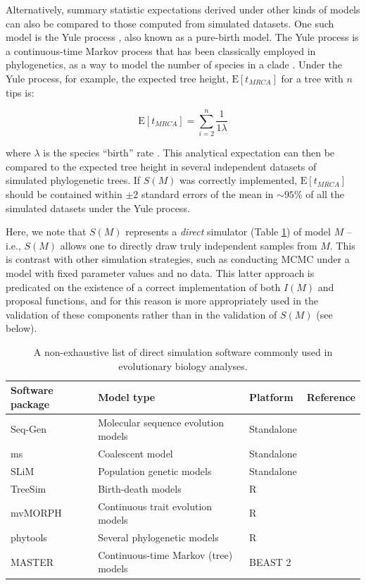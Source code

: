 \documentclass[oneside]{article}
\begin{document}
Alternatively, summary statistic expectations derived under other kinds of models can also be compared
to those computed from simulated datasets.
One such model is the Yule process \citep{yule24}, also known as a pure-birth model.
The Yule process is a continuous-time Markov process that has been
classically employed in phylogenetics, as a way to model the number of
species in a clade \citep{yule24,aldous01}.
Under the Yule process, for example, the expected tree height,
$\text{E}[t_{MRCA}]$ for a tree with $n$ tips is:

\begin{equation}
  \text{E}[t_{MRCA}] = \sum_{i=2}^{n}\frac{1}{1\lambda}
  \label{eq:yule}
\end{equation}

\noindent where $\lambda$ is the species ``birth'' rate \citep{yule24}.
This analytical expectation can then be compared to the expected tree
height in several independent datasets of simulated phylogenetic trees.
If $S(M)$ was correctly implemented, $\text{E}[t_{MRCA}]$ should be contained within $\pm 2$ standard errors of
the mean in $\sim 95\%$ of all the simulated datasets under the Yule process.

Here, we note that $S(M)$ represents a \emph{direct} simulator (Table
\ref{tab:sim}) of model
$M$ -- i.e., $S(M)$ allows one to directly draw truly independent
samples from $M$.
This is contrast with other simulation strategies, such as conducting
MCMC under a model with fixed parameter values and no data.
This latter approach is predicated on the existence of a correct
implementation of both $I(M)$ and proposal functions, and for this
reason is more appropriately used in the validation of these components rather than in
the validation of $S(M)$ (see below).

\begin{center}
  \begin{table}
  \caption{A non-exhaustive list of direct simulation software commonly used in evolutionary
    biology analyses.}
  \label{tab:sim}
  \centering
  \begin{tabular}{ p{0.7in} | p{1.3in} | p{1in} | p{1.1in} }
    \hline
    Software package & Model type & Platform & Reference \\
    \hline  
    Seq-Gen & Molecular sequence evolution models & Standalone & \citealp{rambaut97} \\
    ms & Coalescent model & Standalone & \citealp{hudson02}\\
    SLiM & Population genetic models & Standalone & \citealp{haller19}\\
    TreeSim & Birth-death models & R & \citealp{stadler11}\\
    mvMORPH & Continuous trait evolution models & R &
                                                      \citealp{clavel15}\\
    phytools & Several phylogenetic models & R & \citealp{revell12}\\
    MASTER & Continuous-time Markov (tree) models & BEAST 2 & \citealp{vaughan13}\\
    \hline
  \end{tabular}
  \end{table}
\end{center}
\end{document}
